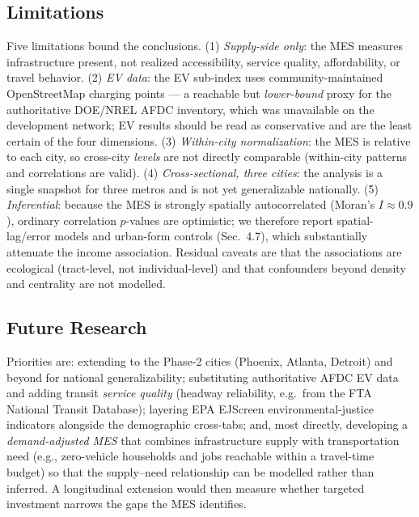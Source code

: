 \documentclass[11pt]{article}
\begin{document}
\subsection{Limitations}
Five limitations bound the conclusions. (1) \emph{Supply-side only}: the MES
measures infrastructure present, not realized accessibility, service quality,
affordability, or travel behavior. (2) \emph{EV data}: the EV sub-index uses
community-maintained OpenStreetMap charging points --- a reachable but
\emph{lower-bound} proxy for the authoritative DOE/NREL AFDC inventory, which was
unavailable on the development network; EV results should be read as
conservative and are the least certain of the four dimensions. (3)
\emph{Within-city normalization}: the MES is relative to each city, so cross-city
\emph{levels} are not directly comparable (within-city patterns and correlations
are valid). (4) \emph{Cross-sectional, three cities}: the analysis is a single
snapshot for three metros and is not yet generalizable nationally. (5)
\emph{Inferential}: because the MES is strongly spatially autocorrelated
(Moran's $I\approx0.9$), ordinary correlation $p$-values are optimistic; we
therefore report spatial-lag/error models and urban-form controls (Sec.~4.7), which
substantially attenuate the income association. Residual caveats are that the
associations are ecological (tract-level, not individual-level) and that
confounders beyond density and centrality are not modelled.

\subsection{Future Research}
Priorities are: extending to the Phase-2 cities (Phoenix, Atlanta, Detroit) and
beyond for national generalizability; substituting authoritative AFDC EV data and
adding transit \emph{service quality} (headway reliability, e.g.\ from the FTA
National Transit Database); layering EPA EJScreen environmental-justice indicators
alongside the demographic cross-tabs; and, most directly, developing a
\emph{demand-adjusted MES} that combines infrastructure supply with transportation
need (e.g., zero-vehicle households and jobs reachable within a travel-time budget)
so that the supply--need relationship can be modelled rather than inferred.
A longitudinal extension would then measure whether targeted investment narrows
the gaps the MES identifies.
\end{document}
